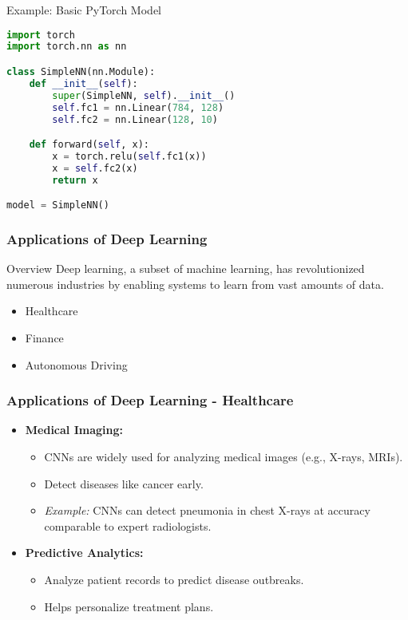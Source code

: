 \documentclass[aspectratio=169]{beamer}
\begin{document}
\begin{frame}[fragile]
    \begin{block}{Example: Basic PyTorch Model}
        \begin{lstlisting}[language=Python]
import torch
import torch.nn as nn

class SimpleNN(nn.Module):
    def __init__(self):
        super(SimpleNN, self).__init__()
        self.fc1 = nn.Linear(784, 128)
        self.fc2 = nn.Linear(128, 10)

    def forward(self, x):
        x = torch.relu(self.fc1(x))
        x = self.fc2(x)
        return x

model = SimpleNN()
        \end{lstlisting}
    \end{block}
\end{frame}

\begin{frame}[fragile]
    \frametitle{Applications of Deep Learning}
    \begin{block}{Overview}
        Deep learning, a subset of machine learning, has revolutionized numerous industries by enabling systems to learn from vast amounts of data. 
    \end{block}
    \begin{itemize}
        \item Healthcare
        \item Finance
        \item Autonomous Driving
    \end{itemize}
\end{frame}

\begin{frame}[fragile]
    \frametitle{Applications of Deep Learning - Healthcare}
    \begin{itemize}
        \item \textbf{Medical Imaging:} 
        \begin{itemize}
            \item CNNs are widely used for analyzing medical images (e.g., X-rays, MRIs).
            \item Detect diseases like cancer early.
            \item \textit{Example:} CNNs can detect pneumonia in chest X-rays at accuracy comparable to expert radiologists.
        \end{itemize}

        \item \textbf{Predictive Analytics:}
        \begin{itemize}
            \item Analyze patient records to predict disease outbreaks.
            \item Helps personalize treatment plans.
        \end{itemize}
    \end{itemize}
\end{frame}
\end{document}
